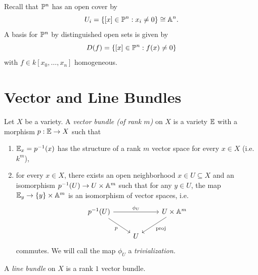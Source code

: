 \begin{remark}
  Recall that $\mathbb{P}^n$ has an
  open cover by
  \[
    U_i
    = \{[x] \in \mathbb{P}^n : x_i \ne 0\}
    \cong \mathbb{A}^n.
  \]
  A basis for $\mathbb{P}^n$ by distinguished
  open sets is given by
  \[
    D(f)
    = \{[x] \in \mathbb{P}^n : f(x) \ne 0\}
  \]
  with $f \in k[x_0, \dots, x_n]$
  homogeneous.
\end{remark}

\section{Vector and Line Bundles}

\begin{definition}
  Let $X$ be a variety. A
  \emph{vector bundle (of rank $m$)}
  on $X$ is a variety
  $\mathbb{E}$ with a morphism
  $p : \mathbb{E} \to X$ such that
  \begin{enumerate}
    \item $\mathbb{E}_x = p^{-1}(x)$ has the
      structure of a rank $m$
      vector space for every $x \in X$ 
      (i.e. $k^m$),
    \item for every $x \in X$,
      there exists an open neighborhood
      $x \in U \subseteq X$ 
      and an isomorphism
      $p^{-1}(U) \to U \times \mathbb{A}^m$
      such that for any $y \in U$,
      the map
      $\mathbb{E}_y \to \{y\} \times \mathbb{A}^m$
      is an isomorphism of vector
      spaces, i.e.
      \[
        \begin{tikzcd}
          p^{-1}(U)
          \ar[rr, "\phi_U"] \ar[dr, "p", swap] & &
          U \times \Affine^m \ar[dl, "\mathrm{proj}"] \\
          & U
        \end{tikzcd}
      \]
      commutes.
      We will call the map $\phi_U$ a
      \emph{trivialization.}
  \end{enumerate}
\end{definition}

\begin{definition}
  A \emph{line bundle} on $X$ is a
  rank $1$ vector bundle.
\end{definition}

